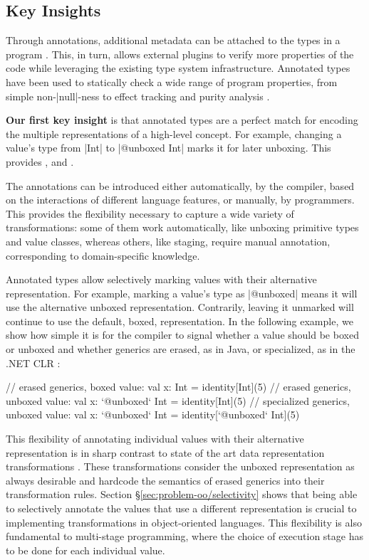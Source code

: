 \subsection*{Key Insights}

Through annotations, additional metadata can be attached to the types in a program \cite{sip-annotations, jsr-annotations}. This, in turn, allows external plugins to verify more properties of the code while leveraging the existing type system infrastructure. Annotated types have been used to statically check a wide range of program properties, from simple non-|null|-ness to effect tracking and purity analysis \cite{papi-annot-typechecker, lukas-thesis}.

\textbf{Our first key insight} is that annotated types are a perfect match for encoding the multiple representations of a high-level concept. For example, changing a value's type from |Int| to |@unboxed Int| marks it for later unboxing. This provides ,  and .

 The annotations can be introduced either automatically, by the compiler, based on the interactions of different language features, or manually, by programmers. This provides the flexibility necessary to capture a wide variety of transformations: some of them work automatically, like unboxing primitive types and value classes, whereas others, like staging, require manual annotation, corresponding to domain-specific knowledge.

 Annotated types allow selectively marking values with their alternative representation. For example, marking a value's type as |@unboxed| means it will use the alternative unboxed representation. Contrarily, leaving it unmarked will continue to use the default, boxed, representation. In the following example, we show how simple it is for the compiler to signal whether a value should be boxed or unboxed and whether generics are erased, as in Java, or specialized, as in the .NET CLR \cite{dot-net-generics, ecma-dotnet}:

\begin{lstlisting-nobreak}
 // erased generics, boxed value:
 val x: Int = identity[Int](5)
 // erased generics, unboxed value:
 val x: `@unboxed` Int = identity[Int](5)
 // specialized generics, unboxed value:
 val x: `@unboxed` Int = identity[`@unboxed` Int](5)
\end{lstlisting-nobreak}

This flexibility of annotating individual values with their alternative representation is in sharp contrast to state of the art data representation transformations \cite{leroy-unboxed-objects, java-erasure}. These transformations consider the unboxed representation as always desirable and hardcode the semantics of erased generics into their transformation rules. Section \S\ref{sec:problem-oo/selectivity} shows that being able to selectively annotate the values that use a different representation is crucial to implementing transformations in object-oriented languages. This flexibility is also fundamental to multi-stage programming, where the choice of execution stage has to be done for each individual value.

